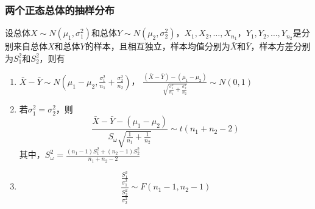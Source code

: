 \subsubsection{两个正态总体的抽样分布}
设总体$X\sim N(\mu_1, \sigma_1^2)$和总体$Y \sim N(\mu_2, \sigma_2^2)$，$X_1, X_2, \dots, X_{n_1}$，$Y_1, Y_2, \dots, Y_{n_2}$是分别来自总体$X$和总体$Y$的样本，且相互独立，样本均值分别为$\bar X$和$\bar Y$，样本方差分别为$S_1^2$和$S_2^2$，则有
\begin{enumerate}
	\item $\bar X - \bar Y \sim N(\mu_1-\mu_2, \frac{\sigma_1^2}{n_1}+\frac{\sigma_2^2}{n_2})$， $\frac{(\bar X - \bar Y)-(\mu_1-\mu_2)}{\sqrt{\frac{\sigma_1^2}{n_1}+\frac{\sigma_2^2}{n_2}}} \sim N(0,1)$
	\item 若$\sigma_1^2 = \sigma_2^2$，则
	\begin{equation}
		\frac{\bar X - \bar Y-(\mu_1 - \mu_2)}{S_\omega \sqrt{\frac{1}{n_1} + \frac{1}{n_2}}} \sim t(n_1+n_2-2)
	\end{equation}
	其中，$S_\omega^2 = \frac{(n_1-1)S_1^2+ (n_2-1)S_2^2}{n_1+n_2-2}$
	\item 
	\begin{equation}
		\frac{\frac{S_1^2}{\sigma_1^2}}{\frac{S_2^2}{\sigma_2^2}} \sim F(n_1-1, n_2-1)
	\end{equation}
\end{enumerate}




















